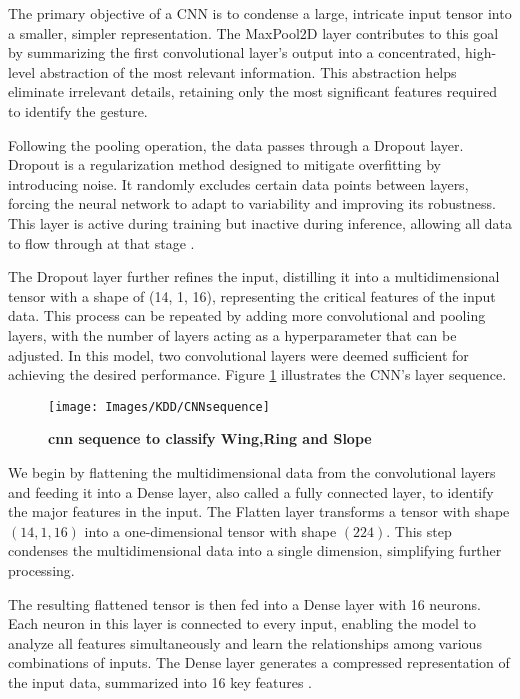 The primary objective of a CNN is to condense a large, intricate input tensor into a smaller, simpler representation. The MaxPool2D layer contributes to this goal by summarizing the first convolutional layer's output into a concentrated, high-level abstraction of the most relevant information. This abstraction helps eliminate irrelevant details, retaining only the most significant features required to identify the gesture.

Following the pooling operation, the data passes through a Dropout layer. Dropout is a regularization method designed to mitigate overfitting by introducing noise. It randomly excludes certain data points between layers, forcing the neural network to adapt to variability and improving its robustness. This layer is active during training but inactive during inference, allowing all data to flow through at that stage \cite{Warden:2020}.

The Dropout layer further refines the input, distilling it into a multidimensional tensor with a shape of (14, 1, 16), representing the critical features of the input data. This process can be repeated by adding more convolutional and pooling layers, with the number of layers acting as a hyperparameter that can be adjusted. In this model, two convolutional layers were deemed sufficient for achieving the desired performance. Figure \ref{fig:CNN sequence} illustrates the CNN's layer sequence.

\begin{figure}[H]
	\texttt{[image: Images/KDD/CNNsequence]}
	\caption{\textbf{\ac{cnn} sequence to classify Wing,Ring and Slope }}
	\label{fig:CNN sequence}
\end{figure}

We begin by flattening the multidimensional data from the convolutional layers and feeding it into a Dense layer, also called a fully connected layer, to identify the major features in the input. The Flatten layer transforms a tensor with shape \( (14, 1, 16) \) into a one-dimensional tensor with shape \( (224) \). This step condenses the multidimensional data into a single dimension, simplifying further processing.

The resulting flattened tensor is then fed into a Dense layer with 16 neurons. Each neuron in this layer is connected to every input, enabling the model to analyze all features simultaneously and learn the relationships among various combinations of inputs. The Dense layer generates a compressed representation of the input data, summarized into 16 key features \cite{Warden:2020}.

